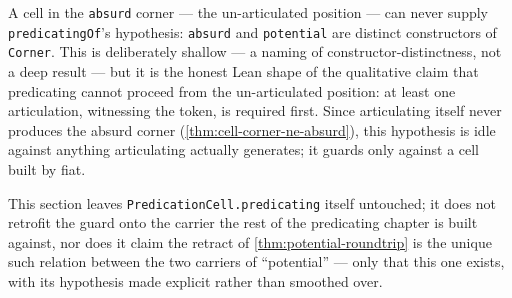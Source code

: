 \begin{proposition}\label{thm:absurd-cannot-predicate}\leanok{}
A cell in the \texttt{absurd} corner --- the un-articulated position --- can
never supply \texttt{predicatingOf}'s hypothesis: \texttt{absurd} and
\texttt{potential} are distinct constructors of \texttt{Corner}. This is
deliberately shallow --- a naming of constructor-distinctness, not a deep
result --- but it is the honest Lean shape of the qualitative claim that
predicating cannot proceed from the un-articulated position: at least one
articulation, witnessing the token, is required first. Since articulating
itself never produces the absurd corner (\cref{thm:cell-corner-ne-absurd}),
this hypothesis is idle against anything articulating actually generates; it
guards only against a cell built by fiat.
\end{proposition}

This section leaves \texttt{PredicationCell.predicating} itself untouched;
it does not retrofit the guard onto the carrier the rest of the predicating
chapter is built against, nor does it claim the retract of
\cref{thm:potential-roundtrip} is the unique such relation between the two
carriers of ``potential'' --- only that this one exists, with its hypothesis
made explicit rather than smoothed over.
